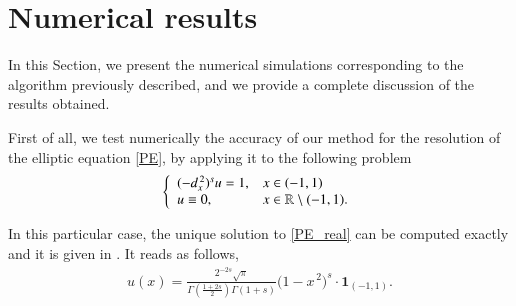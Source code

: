 \section{Numerical results} \label{res_numerical}
In this Section, we present the numerical simulations corresponding to the algorithm previously described, and we provide a complete discussion of the results obtained. 

First of all, we test numerically the accuracy of our method for the resolution of the elliptic equation \eqref{PE}, by applying it to the following problem 
\begin{align}\label{PE_real}
	\left\{\begin{array}{ll}
		(-d_x^{\,2})^{s}u = 1, & x\in(-1,1)
		\\
		u\equiv 0, & x\in\mathbb{R}\setminus(-1,1).
	\end{array}\right.
\end{align}

In this particular case, the unique solution to \eqref{PE_real} can be computed exactly and it is given in \cite{getoor1961first}. It reads as follows, 
\begin{align}\label{real_sol}
	u(x)=\frac{2^{-2s}\sqrt{\pi}}{\Gamma\left(\frac{1+2s}{2}\right)\Gamma(1+s)}\Big(1-x^{\,2}\Big)^s\cdot\mathbf{1}_{(-1,1)}.
\end{align}

